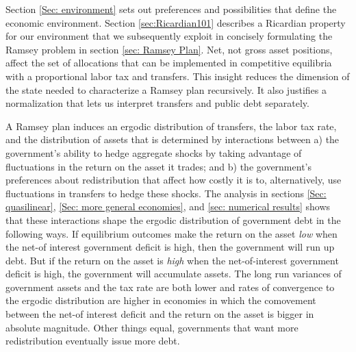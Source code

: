\documentclass[thmsb,11pt]{article}
\begin{document}
%
%

Section \ref{Sec: environment} sets out  preferences and possibilities that define the economic environment.
Section \ref{sec:Ricardian101}
describes a  Ricardian property for our environment that we subsequently exploit in concisely formulating the Ramsey problem
in section \ref{sec: Ramsey Plan}.
Net, not gross asset positions, affect the set of allocations that can be implemented
in competitive equilibria with a proportional labor tax and transfers.
This insight reduces the dimension of the state needed to characterize a Ramsey plan recursively.
It also justifies a normalization that lets  us interpret transfers and public debt separately.



A Ramsey plan induces an ergodic distribution of transfers,   the labor tax rate, and the distribution of assets that is
  determined by interactions between
a) the government's  ability to hedge aggregate shocks by taking advantage of fluctuations in  the return on the asset it trades;
and b) the government's preferences about  redistribution that affect how costly it is to, alternatively, use fluctuations in transfers to hedge these shocks.
The analysis in sections \ref{Sec: quasilinear}, \ref{Sec: more general economies}, and \ref{sec: numerical results}
shows that these interactions  shape  the ergodic distribution of government debt in the following ways.
If equilibrium outcomes make the  return on the asset {\em low} when the net-of interest government deficit is high,
then the government will  run up  debt.  %
But if the return on the asset is {\em high} when the net-of-interest government deficit is high, the
 government will accumulate assets.
  The long run variances of government assets and the tax rate are both lower and  rates of convergence to the ergodic distribution are
higher in economies in which the comovement between the net-of interest deficit and  the return on  the asset is bigger in absolute magnitude.
 Other things equal, governments that want more redistribution eventually issue more debt.
\end{document}

